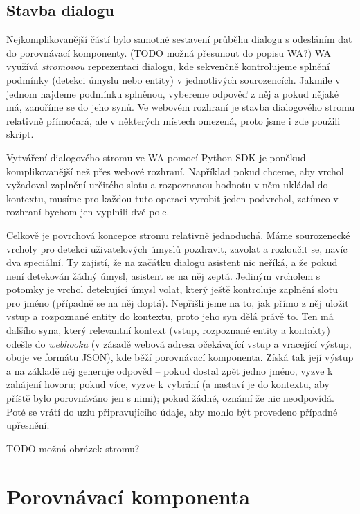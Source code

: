 \subsection{Stavba dialogu}

Nejkomplikovanější částí bylo samotné sestavení průběhu dialogu s odesláním
dat do porovnávací komponenty. (TODO možná přesunout do popisu WA?) WA využívá
\textit{stromovou} reprezentaci dialogu,
kde sekvenčně kontrolujeme splnění podmínky (detekci úmyslu nebo entity) v
jednotlivých sourozencích. Jakmile v jednom najdeme podmínku splněnou, vybereme
odpověď z něj a pokud nějaké má, zanoříme se do jeho synů. Ve webovém rozhraní je
stavba dialogového stromu relativně přímočará, ale v některých místech omezená,
proto jsme i zde použili skript.

Vytváření dialogového stromu ve WA pomocí Python SDK je poněkud komplikovanější
než přes webové rozhraní. Například pokud chceme, aby vrchol vyžadoval zaplnění
určitého slotu a rozpoznanou hodnotu v něm ukládal do kontextu, musíme pro
každou tuto operaci vyrobit jeden podvrchol, zatímco v rozhraní bychom jen
vyplnili dvě pole.

Celkově je povrchová koncepce stromu relativně jednoduchá. Máme sourozenecké
vrcholy pro detekci uživatelových úmyslů pozdravit, zavolat a rozloučit se, navíc
dva speciální. Ty zajistí, že na začátku dialogu asistent nic neříká, a že
pokud není detekován žádný úmysl, asistent se na něj zeptá. Jediným vrcholem
s potomky je vrchol detekující úmysl volat, který ještě kontroluje zaplnění slotu
pro jméno (případně se na něj doptá). Nepřišli jsme na to, jak přímo z něj
uložit vstup a rozpoznané entity do kontextu, proto jeho syn dělá právě to. Ten
má dalšího syna, který relevantní kontext (vstup, rozpoznané entity a kontakty)
odešle do \textit{webhooku} (v zásadě webová adresa očekávající vstup a vracející
výstup, oboje ve formátu JSON), kde běží porovnávací komponenta. Získá tak její
výstup a na základě něj generuje odpověď -- pokud dostal zpět jedno jméno,
vyzve k zahájení hovoru; pokud více, vyzve k vybrání (a nastaví je do kontextu,
aby příště bylo porovnáváno jen s nimi); pokud žádné, oznámí že nic neodpovídá.
Poté se vrátí do uzlu připravujícího údaje, aby mohlo být provedeno případné
upřesnění.

TODO možná obrázek stromu?

\section{Porovnávací komponenta}\label{matching}

